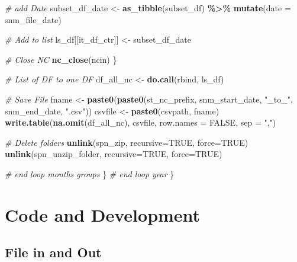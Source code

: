 \documentclass[
]{book}
\newenvironment{Shaded}{\begin{snugshade}}{\end{snugshade}}
\newcommand{\CommentTok}[1]{\textcolor[rgb]{0.56,0.35,0.01}{\textit{#1}}}
\newcommand{\DataTypeTok}[1]{\textcolor[rgb]{0.13,0.29,0.53}{#1}}
\newcommand{\KeywordTok}[1]{\textcolor[rgb]{0.13,0.29,0.53}{\textbf{#1}}}
\newcommand{\NormalTok}[1]{#1}
\newcommand{\OperatorTok}[1]{\textcolor[rgb]{0.81,0.36,0.00}{\textbf{#1}}}
\newcommand{\OtherTok}[1]{\textcolor[rgb]{0.56,0.35,0.01}{#1}}
\newcommand{\StringTok}[1]{\textcolor[rgb]{0.31,0.60,0.02}{#1}}
\begin{document}
\begin{Shaded}
\begin{Highlighting}[]
      \CommentTok{\# add Date}
\NormalTok{      subset\_df\_date \textless{}{-}}\StringTok{ }\KeywordTok{as\_tibble}\NormalTok{(subset\_df) }\OperatorTok{\%\textgreater{}\%}\StringTok{ }\KeywordTok{mutate}\NormalTok{(}\DataTypeTok{date =}\NormalTok{ snm\_file\_date)}

      \CommentTok{\# Add to list}
\NormalTok{      ls\_df[[it\_df\_ctr]] \textless{}{-}}\StringTok{ }\NormalTok{subset\_df\_date}

      \CommentTok{\# Close NC}
      \KeywordTok{nc\_close}\NormalTok{(ncin)}
\NormalTok{    \}}

    \CommentTok{\# List of DF to one DF}
\NormalTok{    df\_all\_nc \textless{}{-}}\StringTok{ }\KeywordTok{do.call}\NormalTok{(rbind, ls\_df)}

    \CommentTok{\# Save File}
\NormalTok{    fname \textless{}{-}}\StringTok{ }\KeywordTok{paste0}\NormalTok{(}\KeywordTok{paste0}\NormalTok{(st\_nc\_prefix,}
\NormalTok{                           snm\_start\_date, }\StringTok{"\_to\_"}\NormalTok{, snm\_end\_date,}
                           \StringTok{".csv"}\NormalTok{))}
\NormalTok{    csvfile \textless{}{-}}\StringTok{ }\KeywordTok{paste0}\NormalTok{(csvpath, fname)}
    \KeywordTok{write.table}\NormalTok{(}\KeywordTok{na.omit}\NormalTok{(df\_all\_nc), csvfile, }\DataTypeTok{row.names =} \OtherTok{FALSE}\NormalTok{, }\DataTypeTok{sep =} \StringTok{","}\NormalTok{)}

    \CommentTok{\# Delete folders}
    \KeywordTok{unlink}\NormalTok{(spn\_zip, }\DataTypeTok{recursive=}\OtherTok{TRUE}\NormalTok{, }\DataTypeTok{force=}\OtherTok{TRUE}\NormalTok{)}
    \KeywordTok{unlink}\NormalTok{(spn\_unzip\_folder, }\DataTypeTok{recursive=}\OtherTok{TRUE}\NormalTok{, }\DataTypeTok{force=}\OtherTok{TRUE}\NormalTok{)}

  \CommentTok{\# end loop months groups}
\NormalTok{  \}}
\CommentTok{\# end loop year}
\NormalTok{\}}
\end{Highlighting}
\end{Shaded}

\hypertarget{code-and-development}{%
\chapter{Code and Development}\label{code-and-development}}

\hypertarget{file-in-and-out}{%
\section{File in and Out}\label{file-in-and-out}}
\end{document}
